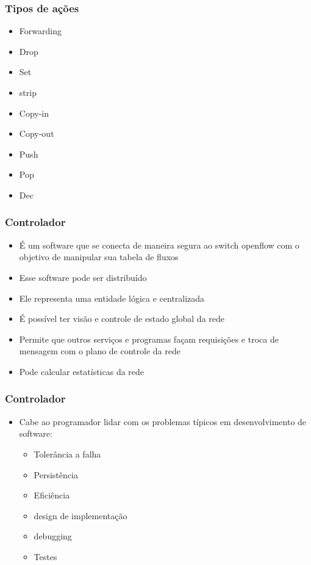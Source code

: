 %
%
\begin{frame}\frametitle{Tipos de ações}

    \begin{itemize}
    \item Forwarding
    \item Drop
    \item Set
    \item strip
    \item Copy-in
    \item Copy-out
    \item Push
    \item Pop
    \item Dec
    \end{itemize}

\end{frame}


%
%
\begin{frame}\frametitle{Controlador}

    \begin{itemize}
    \item É um software que se conecta de maneira segura ao switch openflow
          com o objetivo de manipular sua tabela de fluxos
    \item Esse software pode ser distribuído
    \item Ele representa uma entidade lógica e centralizada
    \item É possível ter visão e controle de estado global da rede
    \item Permite que outros serviços e programas façam requisições e troca
          de mensagem com o plano de controle da rede
    \item Pode calcular estatísticas da rede
    
    \end{itemize}

\end{frame}


%
%
\begin{frame}\frametitle{Controlador}

    \begin{itemize}
    \item Cabe ao programador lidar com os problemas típicos em 
          desenvolvimento de software:
          \begin{itemize}
          \item Tolerância a falha
          \item Persistência
          \item Eficiência
          \item design de implementação
          \item debugging
          \item Testes
          \end{itemize}
    \end{itemize}
\end{frame}

